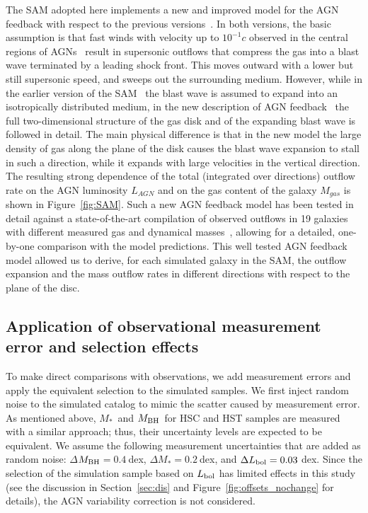 \documentclass[twocolumn]{aastex631}
\def\smass{{$M_*$}}
\def\mbh{$M_{\rm BH}$}
\begin{document}
The SAM adopted here implements a new and improved  model for the AGN feedback with respect to the previous versions~\citep{Menci2008}. In both versions, the basic assumption is that fast winds with velocity up to $10^{-1}c$ observed in the central regions of AGNs~\citep{Chartas2002, Pounds2003}  result in  supersonic outflows that compress the gas into a blast wave terminated by a leading shock front. This  moves outward with a lower but still supersonic speed, and sweeps out the surrounding medium. However, while in the earlier version of the SAM~\citep{Menci2016} the blast wave is assumed to expand into an isotropically distributed medium, in the new description of AGN feedback~\citep{Menci2019} the full two-dimensional structure of the gas disk and of the expanding blast wave is followed in detail. The main physical difference is that in the new model the large density of gas along the plane of the disk causes the blast wave expansion to stall in such a direction, while it expands with large velocities in the vertical direction. The resulting strong dependence of the total (integrated over directions) outflow rate on the AGN luminosity $L_{AGN}$ and on the gas content of the galaxy $M_{gas}$ is shown in Figure~\ref{fig:SAM}. Such a new AGN feedback model has been tested in detail against a state-of-the-art compilation of observed outflows in 19 galaxies with different measured gas and dynamical masses~\citep{Fiore2017}, allowing for a detailed, one-by-one comparison with the model predictions. This well tested AGN feedback model allowed us to derive, for each simulated galaxy in the SAM,  the outflow expansion and the mass outflow rates in different directions with respect to the plane of the disc.



\subsection{Application of observational measurement error and selection effects}\label{subsec:add_obs_eff}
To make direct comparisons with observations, we add measurement errors and apply the equivalent selection to the simulated samples. We first inject random noise to the simulated catalog to mimic the scatter caused by measurement error. As mentioned above, \smass\ and \mbh\ for HSC and HST samples are measured with a similar approach; thus, their uncertainty levels are expected to be equivalent. We assume the following measurement uncertainties that are added as random noise: $\Delta$\mbh$ = 0.4~$dex, $\Delta$\smass$ = 0.2~$dex, and $\Delta L_{\rm bol} = 0.03~$dex. Since the selection of the simulation sample based on $L_{\rm bol}$ has limited effects in this study (see the discussion in Section~\ref{sec:dis} and Figure~\ref{fig:offsets_nochange} for details), the AGN variability correction is not considered.
\end{document}
